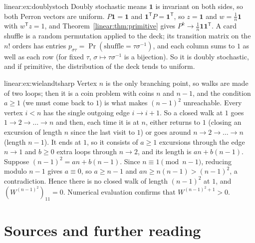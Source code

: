 \begin{solution}{linear:ex:doublystoch}
\idea Doubly stochastic means $\mathbf 1$ is invariant on both sides, so both Perron vectors are uniform.
\writeup $P\mathbf 1=\mathbf 1$ and $\mathbf 1^{\mathsf T}P=\mathbf 1^{\mathsf T}$, so $z=\mathbf 1$ and $w=\frac1n\mathbf 1$ with
$w^{\mathsf T}z=1$, and Theorem~\ref{linear:thm:primitive} gives $P^k\to\frac1n\mathbf 1\mathbf 1^{\mathsf T}$. A card shuffle is a
random permutation applied to the deck; its transition matrix on the $n!$ orders has entries $p_{\sigma\tau}=\Pr(\text{shuffle}=
\tau\sigma^{-1})$, and each column sums to $1$ as well as each row (for fixed $\tau$, $\sigma\mapsto\tau\sigma^{-1}$ is a
bijection). So it is doubly stochastic, and if primitive, the distribution of the deck tends to uniform.
\end{solution}

\begin{solution}{linear:ex:wielandtsharp}
\idea Vertex $n$ is the only branching point, so walks are made of two loops; then it is a coin problem with coins $n$ and
$n-1$, and the condition $a\ge1$ (we must come back to $1$) is what makes $(n-1)^2$ unreachable.
\writeup Every vertex $i<n$ has the single outgoing edge $i\to i+1$. So a closed walk at $1$ goes $1\to2\to\dots\to n$ and then,
each time it is at $n$, either returns to $1$ (closing an excursion of length $n$ since the last visit to $1$) or goes around
$n\to2\to\dots\to n$ (length $n-1$). It ends at $1$, so it consists of $a\ge1$ excursions through the edge $n\to1$ and $b\ge0$ extra
loops through $n\to2$, and its length is $an+b(n-1)$. Suppose $(n-1)^2=an+b(n-1)$. Since $n\equiv1\pmod{n-1}$, reducing modulo
$n-1$ gives $a\equiv0$, so $a\ge n-1$ and $an\ge n(n-1)>(n-1)^2$, a contradiction. Hence there is no closed walk of length
$(n-1)^2$ at $1$, and $(W^{(n-1)^2})_{11}=0$. Numerical evaluation confirms that $W^{(n-1)^2+1}>0$.
\end{solution}

\section*{Sources and further reading}

